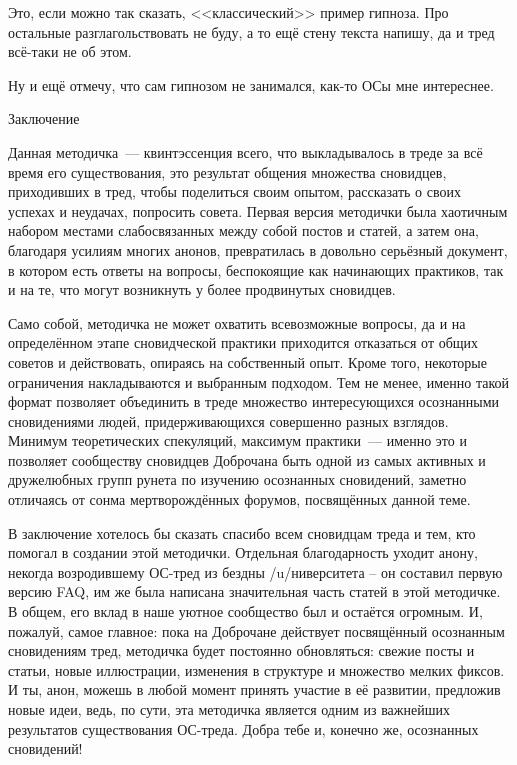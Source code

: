 \documentclass[a5paper,12pt,twoside]{memoir}
\begin{document}
Это, если можно так сказать, <<классический>> пример гипноза. Про остальные разглагольствовать не буду, а то ещё стену текста напишу, да и тред всё-таки не об этом.

Ну и ещё отмечу, что сам гипнозом не занимался, как-то ОСы мне интереснее.



\cleardoublepage

{\large\textsf{Заключение}}

\bigskip

\thispagestyle{empty}

Данная методичка~--- квинтэссенция всего, что выкладывалось в треде за всё время его существования, это результат общения множества сновидцев, приходивших в тред, чтобы поделиться своим опытом, рассказать о своих успехах и неудачах, попросить совета. Первая версия методички была хаотичным набором местами слабосвязанных между собой постов и статей, а затем она, благодаря усилиям многих анонов, превратилась в довольно серьёзный документ, в котором есть ответы на вопросы, беспокоящие как начинающих практиков, так и на те, что могут возникнуть у более продвинутых сновидцев.

Само собой, методичка не может охватить всевозможные вопросы, да и на определённом этапе сновидческой практики приходится отказаться от общих советов и действовать, опираясь на собственный опыт. Кроме того, некоторые ограничения накладываются и выбранным подходом. Тем не менее, именно такой формат позволяет объединить в треде множество интересующихся осознанными сновидениями людей, придерживающихся совершенно разных взглядов. Минимум теоретических спекуляций, максимум практики~--- именно это и позволяет сообществу сновидцев Доброчана быть одной из самых активных и дружелюбных групп рунета по изучению осознанных сновидений, заметно отличаясь от сонма мертворождённых форумов,  посвящённых данной теме.


В заключение хотелось бы сказать спасибо всем сновидцам треда и тем, кто помогал в создании этой методички. Отдельная благодарность уходит анону, некогда возродившему ОС-тред из бездны /u/ни\-вер\-си\-те\-та – он составил первую версию FAQ, им же была написана значительная часть статей в этой методичке. В общем, его вклад в наше уютное сообщество был и остаётся огромным. И, пожалуй, самое главное: пока на Доброчане действует посвящённый осознанным сновидениям тред, методичка будет постоянно обновляться: свежие посты и статьи, новые иллюстрации, изменения в структуре и множество мелких фиксов. И ты, анон, можешь в любой момент принять участие в её развитии, предложив новые идеи, ведь, по сути, эта методичка является одним из важнейших результатов существования ОС-треда. Добра тебе и, конечно же, осознанных сновидений!

\thispagestyle{empty}

\newpage
\thispagestyle{empty}
\mbox{}

\newpage
\thispagestyle{empty}
\mbox{}
\end{document}

